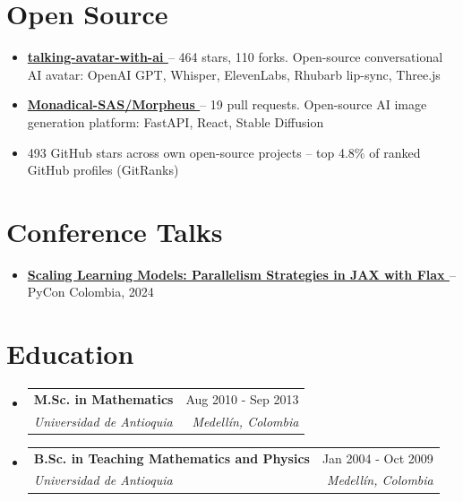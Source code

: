 \documentclass[letterpaper,10pt]{article}
\makeatletter
\newcommand{\resumeSubheading}[4]{
  \vspace{-2pt}
  \item[]
  \begin{tabular*}{\textwidth}{@{\extracolsep{\fill}}l r}
    \textbf{#1} & #2 \\
    \textit{#3} & \textit{#4} \\
  \end{tabular*}
  \vspace{-5pt}
}
\newcommand{\normalfaExternalLink}{{\mdseries\faExternalLink}}
\newcommand{\normalfaYoutube}{{\mdseries\faYoutube}}
\makeatother
\begin{document}
\section{Open Source}
\begin{itemize}[leftmargin=*, itemsep=0pt]
    \item \textbf{\href{https://github.com/asanchezyali/talking-avatar-with-ai}{talking-avatar-with-ai \normalfaExternalLink}} -- 464 stars, 110 forks. Open-source conversational AI avatar: OpenAI GPT, Whisper, ElevenLabs, Rhubarb lip-sync, Three.js
    \item \textbf{\href{https://github.com/Monadical-SAS/Morpheus}{Monadical-SAS/Morpheus \normalfaExternalLink}} -- 19 pull requests. Open-source AI image generation platform: FastAPI, React, Stable Diffusion
    \item 493 GitHub stars across own open-source projects -- top 4.8\% of ranked GitHub profiles (GitRanks)
\end{itemize}

\section{Conference Talks}
\begin{itemize}[leftmargin=*, itemsep=0pt]
    \item \textbf{\href{https://www.youtube.com/watch?v=m4hP1soE414}{Scaling Learning Models: Parallelism Strategies in JAX with Flax \normalfaYoutube}} -- PyCon Colombia, 2024
\end{itemize}

\section{Education}
\begin{itemize}[leftmargin=0pt, itemindent=0pt, label={}]
\resumeSubheading
{M.Sc. in Mathematics}{Aug 2010 - Sep 2013}
{Universidad de Antioquia}{Medell\'in, Colombia}
\resumeSubheading
{B.Sc. in Teaching Mathematics and Physics}{Jan 2004 - Oct 2009}
{Universidad de Antioquia}{Medell\'in, Colombia}
\end{itemize}
\end{document}

